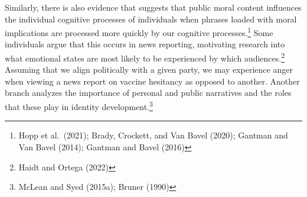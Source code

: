 \documentclass[
  letterpaper,
  DIV=11,
  numbers=noendperiod]{scrartcl}
\theoremstyle{remark}
\begin{document}
Similarly, there is also evidence that suggests that public moral
content influences the individual cognitive processes of individuals
when phrases loaded with moral implications are processed more quickly
by our cognitive processes.\footnote{Hopp et al.~(2021); Brady,
  Crockett, and Van Bavel (2020); Gantman and Van Bavel (2014); Gantman
  and Bavel (2016)} Some individuals argue that this occurs in news
reporting, motivating research into what emotional states are most
likely to be experienced by which audiences.\footnote{Haidt and Ortega
  (2022)} Assuming that we align politically with a given party, we may
experience anger when viewing a news report on vaccine hesitancy as
opposed to another. Another branch analyzes the importance of personal
and public narratives and the roles that these play in identity
development.\footnote{McLean and Syed (2015a); Bruner (1990)}
\end{document}
